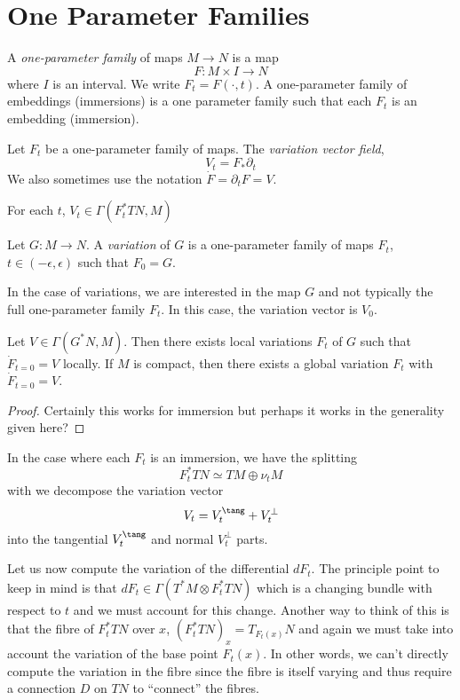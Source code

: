 \section{One Parameter Families}

\begin{defn}
A \emph{one-parameter family} of maps \(M \to N\) is a map
\[
F : M \times I \to N
\]
where \(I\) is an interval. We write \(F_t = F(\cdot, t)\). A one-parameter family of embeddings (immersions) is a one parameter family such that each \(F_t\) is an embedding (immersion).
\end{defn}

\begin{defn}
Let \(F_t\) be a one-parameter family of maps. The \emph{variation vector field},
\[
V_t = F_{\ast} \partial_t
\]
We also sometimes use the notation \(\dot{F} = \partial_t F = V\).
\end{defn}

For each \(t\), \(V_t \in \Gamma(F_t^{\ast} TN, M)\)

\begin{defn}
Let \(G : M \to N\). A \emph{variation} of \(G\) is a one-parameter family of maps \(F_t\), \(t \in (-\epsilon, \epsilon)\) such that \(F_0 = G\).
\end{defn}

In the case of variations, we are interested in the map \(G\) and not typically the full one-parameter family \(F_t\). In this case, the variation vector is \(V_0\).

\begin{lemma}
Let \(V \in \Gamma(G^{\ast} N, M)\). Then there exists local variations \(F_t\) of \(G\) such that \(\dot{F}_{t=0} = V\) locally. If \(M\) is compact, then there exists a global variation \(F_t\) with \(\dot{F}_{t=0} = V\).
\end{lemma}

\begin{proof}
Certainly this works for immersion but perhaps it works in the generality given here?
\end{proof}

In the case where each \(F_t\) is an immersion, we have the splitting
\[
F_t^{\ast} TN \simeq TM \oplus \nu_t M
\]
with we decompose the variation vector
\[
V_t = V^{\tang}_t + V^{\perp}_t
\]
into the tangential \(V^{\tang}_t\) and normal \(V^{\perp}_t\) parts.

Let us now compute the variation of the differential \(dF_t\). The principle point to keep in mind is that \(dF_t \in \Gamma(T^{\ast} M \otimes F_t^{\ast} TN)\) which is a changing bundle with respect to \(t\) and we must account for this change. Another way to think of this is that the fibre of \(F_t^{\ast} TN\) over \(x\), \((F_t^{\ast} TN)_x = T_{F_t(x)} N\) and again we must take into account the variation of the base point \(F_t(x)\). In other words, we can't directly compute the variation in the fibre since the fibre is itself varying and thus require a connection \(D\) on \(TN\) to ``connect'' the fibres.


